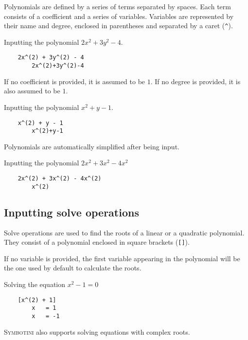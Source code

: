 Polynomials are defined by a series of terms separated by spaces. Each term consists of a coefficient and a series of variables. Variables are represented by their name and degree, enclosed in parentheses and separated by a caret (\texttt{\^}).

\begin{exmp}{Inputting the polynomial $2x^2 + 3y^2 - 4$.}
    \begin{verbatim}
    2x^(2) + 3y^(2) - 4
        2x^(2)+3y^(2)-4
    \end{verbatim}
\end{exmp}

If no coefficient is provided, it is assumed to be $1$. If no degree is provided, it is also assumed to be $1$.

\begin{exmp}
    {Inputting the polynomial $x^2 + y - 1$.}
    \begin{verbatim}
    x^(2) + y - 1
        x^(2)+y-1
    \end{verbatim}
\end{exmp}

Polynomials are automatically simplified after being input.

\begin{exmp}
    {Inputting the polynomial $2x^2 + 3x^2 - 4x^2$}
    \begin{verbatim}
    2x^(2) + 3x^(2) - 4x^(2)
        x^(2)
    \end{verbatim}
\end{exmp}

\subsection{Inputting solve operations}

Solve operations are used to find the roots of a linear or a quadratic polynomial. They consist of a polynomial enclosed in square brackets (\verb|[]|).

If no variable is provided, the first variable appearing in the polynomial will be the one used by default to calculate the roots.

\begin{exmp}{Solving the equation $x^2 - 1 = 0$}
    \begin{verbatim}
    [x^(2) + 1]
        x   = 1
        x   = -1
    \end{verbatim}
\end{exmp}

\textsc{Symbotini} also supports solving equations with complex roots.

